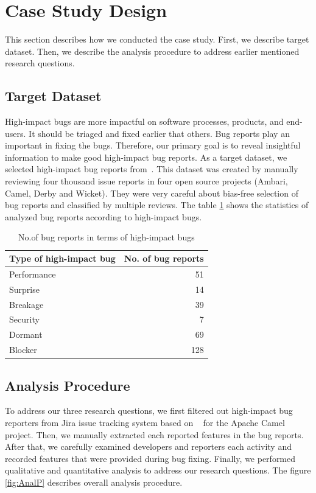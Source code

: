\documentclass[conference]{IEEEtran}
\begin{document}
\section{Case Study Design}
This section describes how we conducted the case study. First, we describe target dataset. Then, we describe the analysis procedure to address earlier mentioned research questions.

\subsection{Target Dataset}
High-impact bugs are more impactful on software processes, products, and end-users. It should be triaged and fixed earlier that others. Bug reports play an important in fixing the bugs. Therefore, our primary goal is to reveal insightful information to make good high-impact bug reports. As a target dataset, we selected high-impact bug reports from~\cite{Ohira:2015}. This dataset was created by manually reviewing four thousand issue reports in four open source projects (Ambari, Camel, Derby and Wicket). They were very careful about bias-free selection of  bug reports and classified by multiple reviews. The table \ref{table:shibr} shows the statistics of analyzed bug reports according to high-impact bugs. 
\begin{table}[h]
\caption{No.of bug reports in terms of high-impact bugs}
\label{table:shibr}
\begin{center}
\begin{tabular}{|l|r|}
\hline
Type of high-impact bug & No. of bug reports  \\
\hline
Performance & 51 \\
Surprise & 14 \\
Breakage & 39 \\
Security & 7 \\
Dormant & 69 \\
Blocker & 128 \\
\hline
\end{tabular}
\end{center}
\end{table}
\subsection{Analysis Procedure}
To address our three research questions, we first filtered out high-impact bug reporters from Jira issue tracking system based on ~\cite{Ohira:2015} for the Apache Camel project. Then, we manually extracted each reported features in the bug reports. After that, we carefully examined developers and reporters each activity and recorded features that were provided during bug fixing. Finally, we performed qualitative and quantitative analysis to address our research questions. The figure \ref{fig:AnalP} describes overall analysis procedure.
\end{document}
